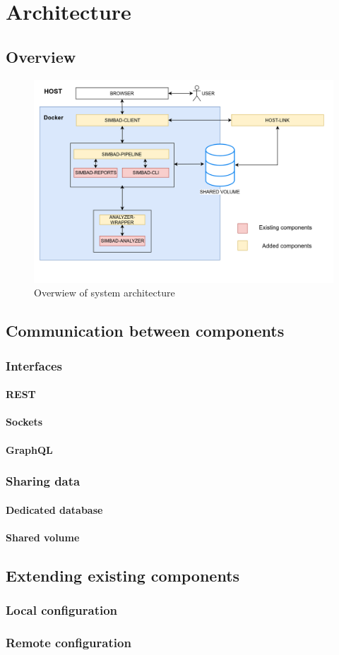 \chapter{Architecture}
\section{Overview}
\begin{figure}[h!]
	\centering
		\includegraphics[width=0.9\linewidth]{diagrams/architecture-diagram.png}
	\caption{Overwiew of system architecture}
	\label{fig:architecture}
\end{figure}
\section{Communication between components}
\subsection{Interfaces}
\subsubsection{REST}
\subsubsection{Sockets}
\subsubsection{GraphQL}
\subsection{Sharing data}
\subsubsection{Dedicated database}
\subsubsection{Shared volume}
\section{Extending existing components}
\subsection{Local configuration}
\subsection{Remote configuration}


